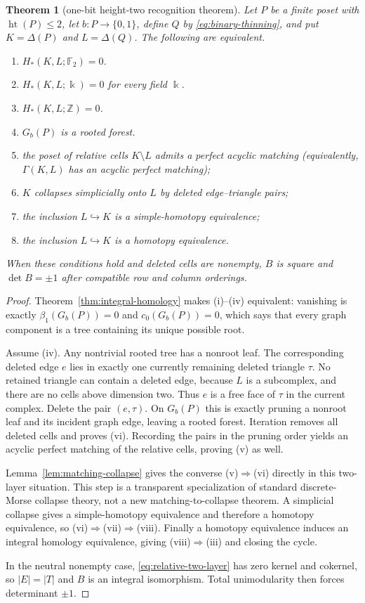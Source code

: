 \documentclass[11pt]{article}
\newtheorem{theorem}{Theorem}[section]
\theoremstyle{definition}
\theoremstyle{remark}
\DeclareMathOperator{\posht}{ht}
\newcommand{\Z}{\mathbb Z}
\newcommand{\Ftwo}{\mathbb F_2}
\newcommand{\D}{\Delta}
\begin{document}
\begin{theorem}[one-bit height-two recognition theorem]\label{thm:main}
Let $P$ be a finite poset with $\posht(P)\le2$, let $b:P\to\{0,1\}$, define $Q$ by
\eqref{eq:binary-thinning}, and put $K=\D(P)$ and $L=\D(Q)$.  The following are
equivalent.
\begin{enumerate}[label=(\roman*)]
\item $H_*(K,L;\Ftwo)=0$.
\item $H_*(K,L;\Bbbk)=0$ for every field $\Bbbk$.
\item $H_*(K,L;\Z)=0$.
\item $G_b(P)$ is a rooted forest.
\item the poset of relative cells $K\setminus L$ admits a perfect acyclic matching
(equivalently, $\Gamma(K,L)$ has an acyclic perfect matching);
\item $K$ collapses simplicially onto $L$ by deleted edge--triangle pairs;
\item the inclusion $L\hookrightarrow K$ is a simple-homotopy equivalence;
\item the inclusion $L\hookrightarrow K$ is a homotopy equivalence.
\end{enumerate}
When these conditions hold and deleted cells are nonempty, $B$ is square and
$\det B=\pm1$ after compatible row and column orderings.
\end{theorem}

\begin{proof}
Theorem~\ref{thm:integral-homology} makes (i)--(iv) equivalent: vanishing is exactly
$\beta_1(G_b(P))=0$ and $c_0(G_b(P))=0$, which says that every graph component is a
tree containing its unique possible root.

Assume (iv).  Any nontrivial rooted tree has a nonroot leaf.  The corresponding
deleted edge $e$ lies in exactly one currently remaining deleted triangle $\tau$.
No retained triangle can contain a deleted edge, because $L$ is a subcomplex, and
there are no cells above dimension two.  Thus $e$ is a free face of $\tau$ in the
current complex.  Delete the pair $(e,\tau)$.  On $G_b(P)$ this is exactly pruning a
nonroot leaf and its incident graph edge, leaving a rooted forest.  Iteration removes
all deleted cells and proves (vi).  Recording the pairs in the pruning order yields an
acyclic perfect matching of the relative cells, proving (v) as well.

Lemma~\ref{lem:matching-collapse} gives the converse (v)$\Rightarrow$(vi) directly in
this two-layer situation.  This step is a transparent specialization of standard
discrete-Morse collapse theory, not a new matching-to-collapse theorem.  A simplicial collapse gives
a simple-homotopy equivalence and
therefore a homotopy equivalence, so (vi)$\Rightarrow$(vii)$\Rightarrow$(viii).
Finally a homotopy equivalence induces an integral homology equivalence, giving
(viii)$\Rightarrow$(iii) and closing the cycle.

In the neutral nonempty case, \eqref{eq:relative-two-layer} has zero kernel and
cokernel, so $|E|=|T|$ and $B$ is an integral isomorphism.  Total unimodularity then
forces determinant $\pm1$.
\end{proof}
\end{document}
